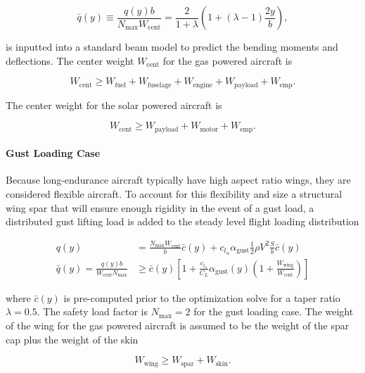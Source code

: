 \begin{equation}
    \label{e:qbar}
    \bar{q}(y) \equiv \frac{q(y)b}{N_{\text{max}}W_{\text{cent}}} = \frac{2}{1+\lambda} \left( 1 + (\lambda - 1) \frac{2y}{b} \right),
\end{equation}

is inputted into a standard beam model to predict the bending moments and deflections. The center weight $W_{\text{cent}}$ for the gas powered aircraft is

\begin{equation}
    W_{\text{cent}} \geq W_{\text{fuel}} + W_{\text{fuselage}} + W_{\text{engine}} + W_{\text{payload}} + W_{\text{emp}}.
\end{equation}

The center weight for the solar powered aircraft is

\begin{equation}
    W_{\text{cent}} \geq W_{\text{payload}} + W_{\text{motor}} + W_{\text{emp}}.
\end{equation}


\paragraph{\textbf{Gust Loading Case}} 

Because long-endurance aircraft typically have high aspect ratio wings, they are considered flexible aircraft. 
To account for this flexibility and size a structural wing spar that will ensure enough rigidity in the event of a gust load, a distributed gust lifting load is added to the steady level flight loading distribution 

\begin{align}
    q(y) &= \frac{N_{\text{max}}W_{\text{cent}}}{b}\bar{c}(y) + c_{l_{\alpha}} \alpha_{\text{gust}} \frac{1}{2} \rho V^2 \frac{S}{b}\bar{c}(y) \\
    \bar{q}(y) = \frac{q(y)b}{W_{\text{cent}}N_{\text{max}}} &\geq \bar{c}(y) \left[1 + \frac{c_{l_{\alpha}}}{C_L} \alpha_{\text{gust}} (y) \left(1 + \frac{W_{\text{wing}}}{W_{\text{cent}}} \right) \right]
\end{align}

where $\bar{c}(y)$ is pre-computed prior to the optimization solve for a taper ratio $\lambda = 0.5$. The safety load factor is $N_{\text{max}}=2$ for the gust loading case. The weight of the wing for the gas powered aircraft is assumed to be the weight of the spar cap plus the weight of the skin 

\begin{equation}
    W_{\text{wing}} \geq W_{\text{spar}} + W_{\text{skin}}.
\end{equation}

